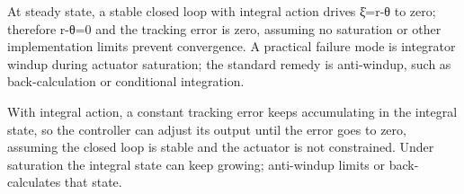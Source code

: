 \documentclass[11pt,a4paper]{article}
\begin{document}
At steady state, a stable closed loop with integral action drives ξ̇=r-θ to zero; therefore r-θ=0 and the tracking error is zero, assuming no saturation or other implementation limits prevent convergence.
A practical failure mode is integrator windup during actuator saturation; the standard remedy is anti-windup, such as back-calculation or conditional integration.\par\smallskip With integral action, a constant tracking error keeps accumulating in the integral state, so the controller can adjust its output until the error goes to zero, assuming the closed loop is stable and the actuator is not constrained. Under saturation the integral state can keep growing; anti-windup limits or back-calculates that state.
\end{document}
